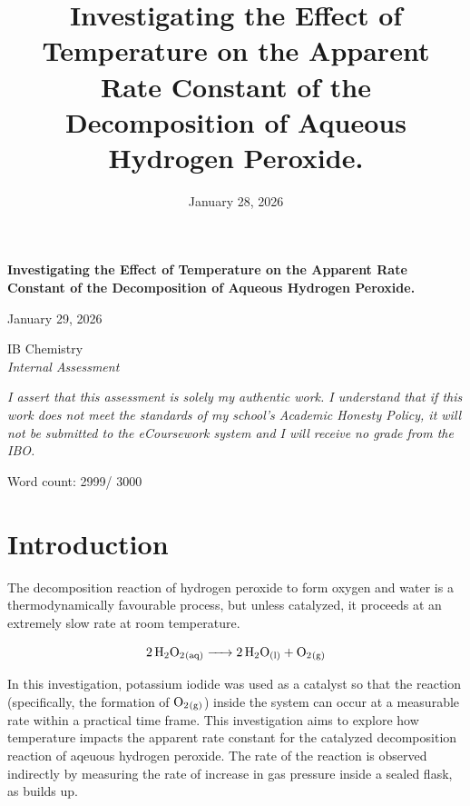 \documentclass[hyphens]{article}
\title{\textbf{Investigating the Effect of Temperature on the Apparent Rate Constant of the Decomposition of Aqueous Hydrogen Peroxide.}}
\date{January 28, 2026}
\newcommand{\realwordcount}{
  \immediate\write18{wc=$(texcount "/Users/jerryhu/Library/CloudStorage/OneDrive-WhiteRockChristianAcademy/12/Chemistry HL/Chemistry IA/Documents/Hu_Jerry_2286509_Investigating-the-Effect-of-Temperature-on-the-Rate-Constant-of-the-Decomposition-of-Aqueous-Hydrogen-Peroxide.tex" | grep "Words in text" | sed -E "s/[^0-9]+//g"); if [ -f wordcount_flag.txt ]; then prev=$(cat wordcount_flag.txt); else prev=0; fi; if [ "$wc" -gt 3000 ] && [ "$prev" -eq 0 ]; then osascript -e 'display alert "Word Count Exceeded" message "Your IA is now over 3000 words."'; echo 1 > wordcount_flag.txt; elif [ "$wc" -le 3000 ]; then echo 0 > wordcount_flag.txt; fi; echo $wc > wordcount.tex}
  
}
\begin{document}
\begin{titlepage}
  \centering
  \vspace*{2.75in}

  {\huge\textbf{Investigating the Effect of Temperature on the Apparent Rate Constant of the Decomposition of Aqueous Hydrogen Peroxide.}}
  \vspace{0.35in}

  \large January 29, 2026 \\
  \vspace{0.2in}

  \large IB  Chemistry \\
  \textit{Internal Assessment}

  \vspace{2.5in}
  \small \textit{I assert that this assessment is solely my authentic work. I understand that if this work does not meet the standards of my school's Academic Honesty Policy, it will not be submitted to the eCoursework system and I will receive no grade from the IBO.}

  \vspace{1in}
  \small Word count: 2999/ 3000
\end{titlepage}

\newpage

\doublespacing
\setcounter{page}{1}

\section{Introduction}
\label{sec:introduction}
\indent \indent The decomposition reaction of hydrogen peroxide to form oxygen and water is a thermodynamically favourable process, but unless catalyzed, it proceeds at an extremely slow rate at room temperature.

\begin{equation}
  \ce{2H2O2_{(aq)} -> 2H2O_{(l)} + O2_{(g)}}
\end{equation}

\noindent In this investigation, potassium iodide was used as a catalyst so that the reaction (specifically, the formation of $\ce{O2_{(g)}}$) inside the system can occur at a measurable rate within a practical time frame. This investigation aims to explore how temperature impacts the apparent rate constant for the catalyzed decomposition reaction of aqeuous hydrogen peroxide. The rate of the reaction is observed indirectly by measuring the rate of increase in gas pressure inside a sealed flask, as  builds up.
\end{document}
